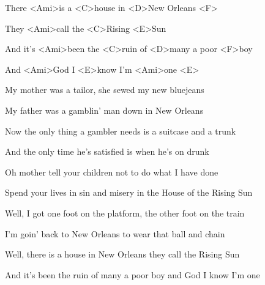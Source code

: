 

\zs
There <Ami>is a <C>house in <D>New Orleans <F>

They <Ami>call the <C>Rising <E>Sun

And it's <Ami>been the <C>ruin of <D>many a poor <F>boy

And <Ami>God I <E>know I'm <Ami>one <E>
\ks

\zs
My mother was a tailor, she sewed my new bluejeans

My father was a gamblin' man down in New Orleans
\ks

\zs
Now the only thing a gambler needs is a suitcase and a trunk

And the only time he's satisfied is when he's on drunk
\ks

\zs
Oh mother tell your children not to do what I have done

Spend your lives in sin and misery in the House of the Rising Sun
\ks

\zs
Well, I got one foot on the platform, the other foot on the train

I'm goin' back to New Orleans to wear that ball and chain
\ks

\zs
Well, there is a house in New Orleans they call the Rising Sun

And it's been the ruin of many a poor boy and God I know I'm one
\ks

\kp
